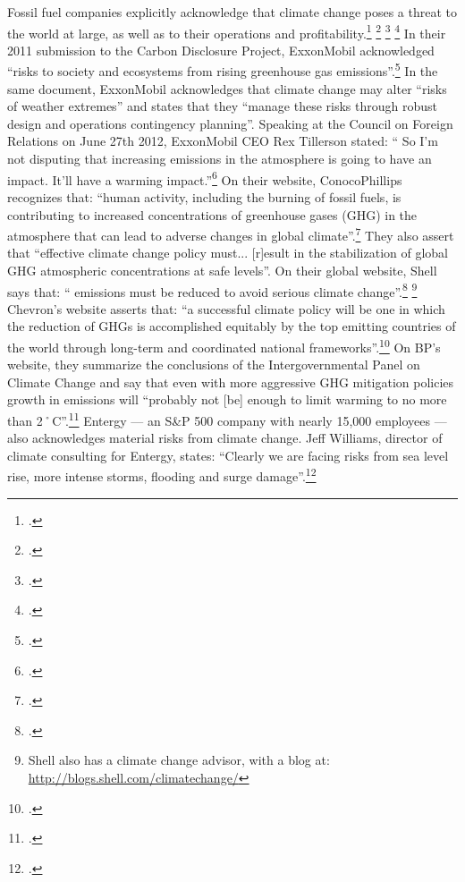 Fossil fuel companies explicitly acknowledge that climate change poses a threat to the world at large, as well as to their operations and profitability.\footcite[][]{FFcorpsPlanning} \footcite[][]{OilCosFearFI} \footcite[][]{DemiseOfCrudeDenial} \footcite[][]{DoTheOpposite}
In their 2011 submission to the Carbon Disclosure Project, ExxonMobil acknowledged ``risks to society and ecosystems from rising greenhouse gas emissions''.\footcite[][]{ExxonCDP2011}
In the same document, ExxonMobil acknowledges that climate change may alter ``risks of weather extremes'' and states that they ``manage these risks through robust design and operations contingency planning''.
Speaking at the Council on Foreign Relations on June 27th 2012, ExxonMobil CEO Rex Tillerson stated: `` So I'm not disputing that increasing  emissions in the atmosphere is going to have an impact. It'll have a warming impact.''\footcite[][]{Tillerson}
On their website, ConocoPhillips recognizes that: ``human activity, including the burning of fossil fuels, is contributing to increased concentrations of greenhouse gases (GHG) in the atmosphere that can lead to adverse changes in global climate''.\footcite[][]{ConocoPhillipsCC}
They also assert that ``effective climate change policy must... [r]esult in the stabilization of global GHG atmospheric concentrations at safe levels''.
On their global website, Shell says that: `` emissions must be reduced to avoid serious climate change''.\footcite[][]{ShellClimateChange} \footnote{Shell also has a climate change advisor, with a blog at: \url{http://blogs.shell.com/climatechange/}}
Chevron's website asserts that: ``a successful climate policy will be one in which the reduction of GHGs is accomplished equitably by the top emitting countries of the world through long-term and coordinated national frameworks''.\footcite[][]{}
On BP's website, they summarize the conclusions of the Intergovernmental Panel on Climate Change and say that even with more aggressive GHG mitigation policies growth in  emissions will ``probably not [be] enough to limit warming to no more than 2˚C''.\footcite[][]{BPClimateChange}
Entergy --- an S\&P 500 company with nearly 15,000 employees --- also acknowledges material risks from climate change.
Jeff Williams, director of climate consulting for Entergy, states: ``Clearly we are facing risks from sea level rise, more intense storms, flooding and surge damage''.\footcite[][]{ShiftToClimatePreparedness}


